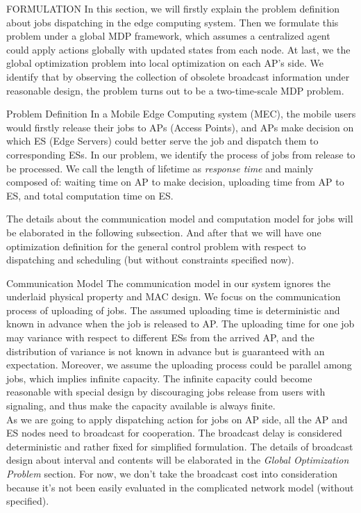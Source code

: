 \documentclass[10pt, conference, letterpaper]{IEEEtran}
\begin{document}
    \begin{section}{FORMULATION}
        \label{sec:formulation}
        In this section, we will firstly explain the problem definition about jobs dispatching in the edge computing system. Then we formulate this problem under a global MDP framework, which assumes a centralized agent could apply actions globally with updated states from each node. At last, we the global optimization problem into local optimization on each AP's side. We identify that by observing the collection of obsolete broadcast information under reasonable design, the problem turns out to be a two-time-scale MDP problem.

        \begin{subsection}{Problem Definition}
            In a Mobile Edge Computing system (MEC), the mobile users would firstly release their jobs to APs (Access Points), and APs make decision on which ES (Edge Servers) could better serve the job and dispatch them to corresponding ESs.
            In our problem, we identify the process of jobs from release to be processed. We call the length of lifetime as \emph{response time} and mainly composed of: waiting time on AP to make decision, uploading time from AP to ES, and total computation time on ES.
            
            The details about the communication model and computation model for jobs will be elaborated in the following subsection. And after that we will have one optimization definition for the general control problem with respect to dispatching and scheduling (but without constraints specified now).

            \begin{subsubsection}{Communication Model}
                The communication model in our system ignores the underlaid physical property and MAC design. We focus on the communication process of uploading of jobs.
                The assumed uploading time is deterministic and known in advance when the job is released to AP. The uploading time for one job may variance with respect to different ESs from the arrived AP, and the distribution of variance is not known in advance but is guaranteed with an expectation.
                Moreover, we assume the uploading process could be parallel among jobs, which implies infinite capacity. The infinite capacity could become reasonable with special design by discouraging jobs release from users with signaling, and thus make the capacity available is always finite.
                \\
                As we are going to apply dispatching action for jobs on AP side, all the AP and ES nodes need to broadcast for cooperation. The broadcast delay is considered deterministic and rather fixed {for simplified formulation}.
                The details of broadcast design about interval and contents will be elaborated in the \textit{Global Optimization Problem} section.
                For now, we don't take the broadcast cost into consideration because it's not been easily evaluated in the complicated network model (without specified).
            \end{subsubsection}


\end{subsection}
\end{section}
\end{document}
